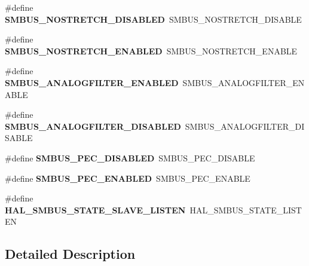 \begin{DoxyCompactItemize}
\#define {\bfseries S\+M\+B\+U\+S\+\_\+\+N\+O\+S\+T\+R\+E\+T\+C\+H\+\_\+\+D\+I\+S\+A\+B\+L\+ED}~S\+M\+B\+U\+S\+\_\+\+N\+O\+S\+T\+R\+E\+T\+C\+H\+\_\+\+D\+I\+S\+A\+B\+LE
\item 
\mbox{\label{group___h_a_l___s_m_b_u_s___aliased___defines_gac13cdfb033be4b09e90f8d65745d48c2}} 
\#define {\bfseries S\+M\+B\+U\+S\+\_\+\+N\+O\+S\+T\+R\+E\+T\+C\+H\+\_\+\+E\+N\+A\+B\+L\+ED}~S\+M\+B\+U\+S\+\_\+\+N\+O\+S\+T\+R\+E\+T\+C\+H\+\_\+\+E\+N\+A\+B\+LE
\item 
\mbox{\label{group___h_a_l___s_m_b_u_s___aliased___defines_gaf636bd945246ff29d4e35ee3be6f1f6d}} 
\#define {\bfseries S\+M\+B\+U\+S\+\_\+\+A\+N\+A\+L\+O\+G\+F\+I\+L\+T\+E\+R\+\_\+\+E\+N\+A\+B\+L\+ED}~S\+M\+B\+U\+S\+\_\+\+A\+N\+A\+L\+O\+G\+F\+I\+L\+T\+E\+R\+\_\+\+E\+N\+A\+B\+LE
\item 
\mbox{\label{group___h_a_l___s_m_b_u_s___aliased___defines_ga2af661132b3a2cd8c964dc2104f8223d}} 
\#define {\bfseries S\+M\+B\+U\+S\+\_\+\+A\+N\+A\+L\+O\+G\+F\+I\+L\+T\+E\+R\+\_\+\+D\+I\+S\+A\+B\+L\+ED}~S\+M\+B\+U\+S\+\_\+\+A\+N\+A\+L\+O\+G\+F\+I\+L\+T\+E\+R\+\_\+\+D\+I\+S\+A\+B\+LE
\item 
\mbox{\label{group___h_a_l___s_m_b_u_s___aliased___defines_ga8f509e1a8b4bbcd2f687f066e8dafffb}} 
\#define {\bfseries S\+M\+B\+U\+S\+\_\+\+P\+E\+C\+\_\+\+D\+I\+S\+A\+B\+L\+ED}~S\+M\+B\+U\+S\+\_\+\+P\+E\+C\+\_\+\+D\+I\+S\+A\+B\+LE
\item 
\mbox{\label{group___h_a_l___s_m_b_u_s___aliased___defines_ga446c885b16518a909013c12085584e21}} 
\#define {\bfseries S\+M\+B\+U\+S\+\_\+\+P\+E\+C\+\_\+\+E\+N\+A\+B\+L\+ED}~S\+M\+B\+U\+S\+\_\+\+P\+E\+C\+\_\+\+E\+N\+A\+B\+LE
\item 
\mbox{\label{group___h_a_l___s_m_b_u_s___aliased___defines_ga76b21c836a3097828fdb6635777414ae}} 
\#define {\bfseries H\+A\+L\+\_\+\+S\+M\+B\+U\+S\+\_\+\+S\+T\+A\+T\+E\+\_\+\+S\+L\+A\+V\+E\+\_\+\+L\+I\+S\+T\+EN}~H\+A\+L\+\_\+\+S\+M\+B\+U\+S\+\_\+\+S\+T\+A\+T\+E\+\_\+\+L\+I\+S\+T\+EN
\end{DoxyCompactItemize}


\subsection{Detailed Description}

